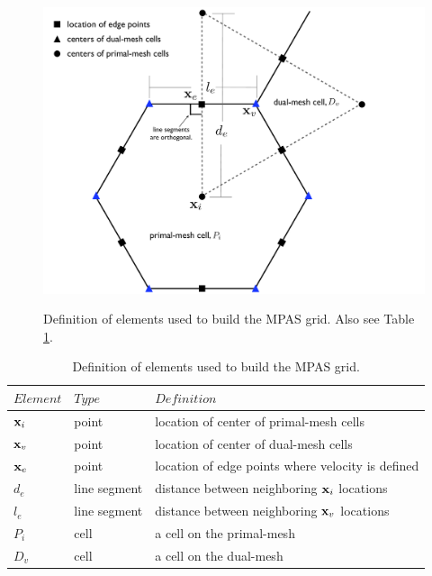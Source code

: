 \begin{figure}[p]
  \noindent\includegraphics[width=16cm,angle=0]{figures/variablePosition.pdf}\\
  \caption{Definition of elements used to build the MPAS grid. Also see Table \ref{table:variablePosition}.}
  \label{figure:variablePosition}
\end{figure}
%
\begin{table}[p]
\caption{Definition of elements used to build the MPAS grid.}
\label{table:variablePosition}
\begin{center}
\begin{tabular}{lll}
\hline\hline
$Element$ & $Type$ & $Definition$\\
\hline
 ${\bf x}_i$   & point             & location of center of primal-mesh cells \\
 ${\bf x}_v$  &  point            & location of center of dual-mesh cells \\
 ${\bf x}_e$  & point             & location of edge points where velocity is defined \\
 $d_{e}$       & line segment & distance between neighboring ${\bf x}_i$ locations \\
 $l_{e}$       & line segment & distance between neighboring ${\bf x}_v$ locations \\
 $P_i$         & cell                 & a cell on the primal-mesh \\
 $D_v$        & cell                 & a cell on the dual-mesh \\
\hline
\end{tabular}
\end{center}
\end{table}



